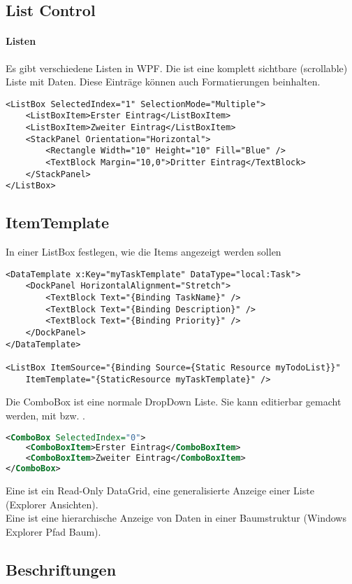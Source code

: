 \subsection{List Control}
\paragraph{Listen} Es gibt verschiedene Listen in WPF. Die  ist eine komplett sichtbare (scrollable) Liste mit Daten. Diese Einträge können auch Formatierungen beinhalten.
\begin{lstlisting}
<ListBox SelectedIndex="1" SelectionMode="Multiple">
    <ListBoxItem>Erster Eintrag</ListBoxItem>
    <ListBoxItem>Zweiter Eintrag</ListBoxItem>
    <StackPanel Orientation="Horizontal">
        <Rectangle Width="10" Height="10" Fill="Blue" />
        <TextBlock Margin="10,0">Dritter Eintrag</TextBlock>
    </StackPanel>
</ListBox>
\end{lstlisting}

\subsection{ItemTemplate}
In einer ListBox festlegen, wie die Items angezeigt werden sollen
\begin{lstlisting}
<DataTemplate x:Key="myTaskTemplate" DataType="local:Task">
    <DockPanel HorizontalAlignment="Stretch">
        <TextBlock Text="{Binding TaskName}" />
        <TextBlock Text="{Binding Description}" />
        <TextBlock Text="{Binding Priority}" />
    </DockPanel>
</DataTemplate>

<ListBox ItemSource="{Binding Source={Static Resource myTodoList}}"
    ItemTemplate="{StaticResource myTaskTemplate}" />
\end{lstlisting}

Die ComboBox ist eine normale DropDown Liste. Sie kann editierbar gemacht werden, mit  bzw. .
\begin{lstlisting}[language=xml]
<ComboBox SelectedIndex="0">
    <ComboBoxItem>Erster Eintrag</ComboBoxItem>
    <ComboBoxItem>Zweiter Eintrag</ComboBoxItem>
</ComboBox>
\end{lstlisting}
Eine  ist ein Read-Only DataGrid, eine generalisierte Anzeige einer Liste (Explorer Ansichten).\\
Eine  ist eine hierarchische Anzeige von Daten in einer Baumstruktur (Windows Explorer Pfad Baum).
\subsection{Beschriftungen} 
